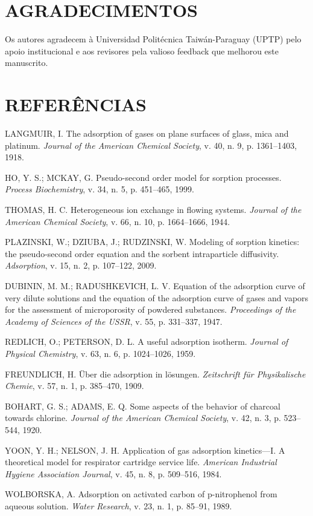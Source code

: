 \documentclass[openany, a4paper, twoside]{article}
\begin{document}
\section*{AGRADECIMENTOS}

Os autores agradecem à Universidad Politécnica Taiwán-Paraguay (UPTP) pelo apoio institucional e aos revisores pela valioso feedback que melhorou este manuscrito.

\renewcommand{\bibsection}{}

\section*{REFERÊNCIAS}

\raggedright

LANGMUIR, I. The adsorption of gases on plane surfaces of glass, mica and platinum. \textit{Journal of the American Chemical Society}, v. 40, n. 9, p. 1361--1403, 1918.

HO, Y. S.; MCKAY, G. Pseudo-second order model for sorption processes. \textit{Process Biochemistry}, v. 34, n. 5, p. 451--465, 1999.

THOMAS, H. C. Heterogeneous ion exchange in flowing systems. \textit{Journal of the American Chemical Society}, v. 66, n. 10, p. 1664--1666, 1944.

PLAZINSKI, W.; DZIUBA, J.; RUDZINSKI, W. Modeling of sorption kinetics: the pseudo-second order equation and the sorbent intraparticle diffusivity. \textit{Adsorption}, v. 15, n. 2, p. 107--122, 2009.

DUBININ, M. M.; RADUSHKEVICH, L. V. Equation of the adsorption curve of very dilute solutions and the equation of the adsorption curve of gases and vapors for the assessment of microporosity of powdered substances. \textit{Proceedings of the Academy of Sciences of the USSR}, v. 55, p. 331--337, 1947.

REDLICH, O.; PETERSON, D. L. A useful adsorption isotherm. \textit{Journal of Physical Chemistry}, v. 63, n. 6, p. 1024--1026, 1959.

FREUNDLICH, H. Über die adsorption in lösungen. \textit{Zeitschrift für Physikalische Chemie}, v. 57, n. 1, p. 385--470, 1909.

BOHART, G. S.; ADAMS, E. Q. Some aspects of the behavior of charcoal towards chlorine. \textit{Journal of the American Chemical Society}, v. 42, n. 3, p. 523--544, 1920.

YOON, Y. H.; NELSON, J. H. Application of gas adsorption kinetics---I. A theoretical model for respirator cartridge service life. \textit{American Industrial Hygiene Association Journal}, v. 45, n. 8, p. 509--516, 1984.

WOLBORSKA, A. Adsorption on activated carbon of p-nitrophenol from aqueous solution. \textit{Water Research}, v. 23, n. 1, p. 85--91, 1989.
\end{document}
